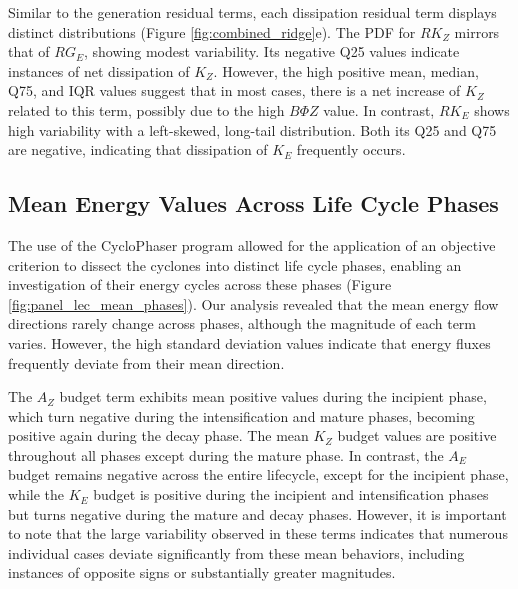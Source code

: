 \documentclass[pdflatex,sn-chicago]{sn-jnl}%
\theoremstyle{plain}
\theoremstyle{definition}
\theoremstyle{remark}
\theoremstyle{definition}
\begin{document}
Similar to the generation residual terms, each dissipation residual term displays distinct distributions (Figure \ref{fig:combined_ridge}e). The PDF for $RK_Z$ mirrors that of $RG_E$, showing modest variability. Its negative Q25 values indicate instances of net dissipation of $K_Z$. However, the high positive mean, median, Q75, and IQR values suggest that in most cases, there is a net increase of $K_Z$ related to this term, possibly due to the high $B\Phi Z$ value. In contrast, $RK_E$ shows high variability with a left-skewed, long-tail distribution. Both its Q25 and Q75 are negative, indicating that dissipation of $K_E$ frequently occurs.

\subsection{Mean Energy Values Across Life Cycle Phases}\label{sec:mean}

The use of the CycloPhaser program allowed for the application of an objective criterion to dissect the cyclones into distinct life cycle phases, enabling an investigation of their energy cycles across these phases (Figure \ref{fig:panel_lec_mean_phases}). Our analysis revealed that the mean energy flow directions rarely change across phases, although the magnitude of each term varies. However, the high standard deviation values indicate that energy fluxes frequently deviate from their mean direction.

The $A_Z$ budget term exhibits mean positive values during the incipient phase, which turn negative during the intensification and mature phases, becoming positive again during the decay phase. The mean $K_Z$ budget values are positive throughout all phases except during the mature phase. In contrast, the $A_E$ budget remains negative across the entire lifecycle, except for the incipient phase, while the $K_E$ budget is positive during the incipient and intensification phases but turns negative during the mature and decay phases. However, it is important to note that the large variability observed in these terms indicates that numerous individual cases deviate significantly from these mean behaviors, including instances of opposite signs or substantially greater magnitudes.
\end{document}
